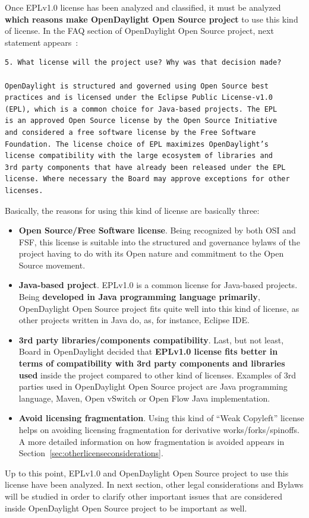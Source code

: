\documentclass[a4paper, 12pt]{book}
\begin{document}
Once EPLv1.0 license has been analyzed and classified, it must be analyzed \textbf{which reasons make OpenDaylight Open Source project} to use this kind of license. In the FAQ section of OpenDaylight Open Source project, next statement appears~\cite{OpenDaylightFAQ5}:

\begin{verbatim}
5. What license will the project use? Why was that decision made?

OpenDaylight is structured and governed using Open Source best
practices and is licensed under the Eclipse Public License-v1.0
(EPL), which is a common choice for Java-based projects. The EPL
is an approved Open Source license by the Open Source Initiative
and considered a free software license by the Free Software
Foundation. The license choice of EPL maximizes OpenDaylight’s
license compatibility with the large ecosystem of libraries and
3rd party components that have already been released under the EPL
license. Where necessary the Board may approve exceptions for other
licenses.
\end{verbatim}
Basically, the reasons for using this kind of license are basically three:
\begin{itemize}
 \item{\textbf{Open Source/Free Software license}}. Being recognized by both OSI and FSF, this license is suitable into the structured and governance bylaws of the project having to do with its Open nature and commitment to the Open Source movement.
 \item{\textbf{Java-based project}}. EPLv1.0 is a common license for Java-based projects. Being \textbf{developed in Java programming language primarily}, OpenDaylight Open Source project fits quite well into this kind of license, as other projects written in Java do, as, for instance, Eclipse IDE.
 \item{\textbf{3rd party libraries/components compatibility}}. Last, but not least, Board in OpenDaylight decided that \textbf{EPLv1.0 license fits better in terms of compatibility with 3rd party components and libraries used} inside the project compared to other kind of licenses. Examples of 3rd parties used in OpenDaylight Open Source project are Java programming language, Maven, Open vSwitch or Open Flow Java implementation.
 \item{\textbf{Avoid licensing fragmentation}}. Using this kind of ``Weak Copyleft'' license helps on avoiding licensing fragmentation for derivative works/forks/spinoffs. A more detailed information on how fragmentation is avoided appears in Section~\ref{sec:otherlicenseconsiderations}.
\end{itemize}
Up to this point, EPLv1.0 and OpenDaylight Open Source project to use this license have been analyzed. In next section, other legal considerations and Bylaws will be studied in order to clarify other important issues that are considered inside OpenDaylight Open Source project to be important as well.
\end{document}
